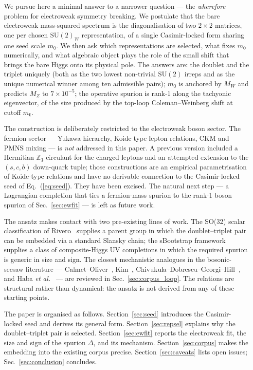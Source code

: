 \documentclass[%
 aps,
 prd,
 reprint,
 nofootinbib,
 superscriptaddress,
 amsmath,
 amssymb,
]{revtex4-2}
\begin{document}
We pursue here a minimal answer to a narrower question --- the \emph{wherefore} problem for electroweak symmetry breaking. We postulate that the bare electroweak mass-squared spectrum is the diagonalisation of two $2\times 2$ matrices, one per chosen $\mathrm{SU}(2)_W$ representation, of a single Casimir-locked form sharing one seed scale $m_0$. We then ask which representations are selected, what fixes $m_0$ numerically, and what algebraic object plays the role of the small shift that brings the bare Higgs onto its physical pole. The answers are: the doublet and the triplet uniquely (both as the two lowest non-trivial $\mathrm{SU}(2)$ irreps and as the unique numerical winner among ten admissible pairs); $m_0$ is anchored by $M_W$ and predicts $M_Z$ to $7\times10^{-5}$; the operative spurion is rank-1 along the tachyonic eigenvector, of the size produced by the top-loop Coleman--Weinberg shift at cutoff $m_0$.

The construction is deliberately restricted to the electroweak boson sector. The fermion sector --- Yukawa hierarchy, Koide-type lepton relations, CKM and PMNS mixing --- is \emph{not} addressed in this paper. A previous version included a Hermitian $\mathbb{Z}_3$ circulant for the charged leptons and an attempted extension to the $(s,c,b)$ down-quark tuple; those constructions are an empirical parametrisation of Koide-type relations and have no derivable connection to the Casimir-locked seed of Eq.~(\ref{eq:seed}). They have been excised. The natural next step --- a Lagrangian completion that ties a fermion-mass spurion to the rank-1 boson spurion of Sec.~\ref{sec:ewfit} --- is left as future work.

The ansatz makes contact with two pre-existing lines of work. The SO(32) scalar classification of Rivero~\cite{Rivero2024SO32} supplies a parent group in which the doublet--triplet pair can be embedded via a standard Slansky chain; the sBootstrap framework~\cite{Rivero2005sBoot} supplies a class of composite-Higgs UV completions in which the required spurion is generic in size and sign. The closest mechanistic analogues in the bosonic-seesaw literature --- Calmet--Oliver~\cite{CalmetOliver2007}, Kim~\cite{Kim2005}, Chivukula--Dobrescu--Georgi--Hill~\cite{Chivukula1999}, and Haba \emph{et al.}~\cite{Haba2016} --- are reviewed in Sec.~\ref{sec:corpus_loop}. The relations are structural rather than dynamical: the ansatz is not derived from any of these starting points.

The paper is organised as follows. Section~\ref{sec:seed} introduces the Casimir-locked seed and derives its general form. Section~\ref{sec:repsel} explains why the doublet--triplet pair is selected. Section~\ref{sec:ewfit} reports the electroweak fit, the size and sign of the spurion $\Delta$, and its mechanism. Section~\ref{sec:corpus} makes the embedding into the existing corpus precise. Section~\ref{sec:caveats} lists open issues; Sec.~\ref{sec:conclusion} concludes.
\end{document}
